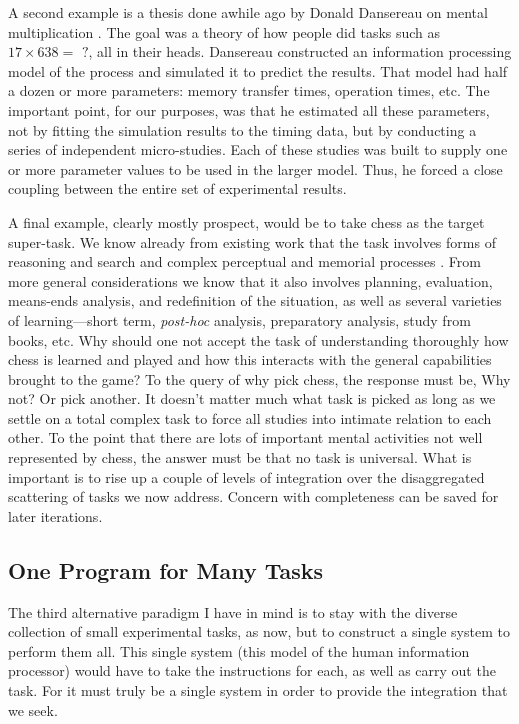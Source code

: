 \documentclass{paper}
\newcounter{oldpagecounter}
\newcommand\oldpage{\stepcounter{oldpagecounter}\marginpar{\footnotesize{\textcolor{mygrey}{pg. \arabic{oldpagecounter}}}}}
\begin{document}
A second example is a thesis done awhile ago by Donald Dansereau on mental multiplication \citep{Dansereau1969}. The goal was a theory of how people did tasks such as $17 \times 638 =\textrm{ ?}$, all in their heads. Dansereau constructed an information processing model of the process and simulated it to predict the results. That model had half a dozen or more parameters: memory transfer times, operation times, etc. The important point, for our purposes, was that he estimated all these parameters, not by fitting the simulation results to the timing data, but by conducting a series of independent micro-studies. Each of these studies was built to supply one or more parameter values to be used in the larger model. Thus, he forced a close coupling between the entire set of experimental results.

A final example, clearly mostly prospect, would be to take chess as the target super-task. We know already from existing work that the task involves forms of reasoning and search \citep{deGroot1965, NewellSimon1972, WagnerScurrah1971} and complex perceptual and memorial processes \citep[Chase \& Simon, This volume, Chapter 5]{deGroot1966}. From more general considerations we know that it also involves planning, evaluation, means-ends analysis, and redefinition of the situation, as well as several varieties of learning---short term, \textit{post-hoc} analysis, preparatory analysis, study from books, etc. Why should one not accept the task of understanding thoroughly how chess is learned and played and how this interacts with the general capabilities brought to the game? To the query of why pick chess, the response must be, Why not? Or pick another. It doesn't matter much what task is picked as long as we settle on a total complex task to force all studies into intimate relation to each other. To the point that there are lots of important mental activities not well represented by chess, the answer must be that no task is universal. What is important is to rise up a couple of levels of integration over the disaggregated scattering of tasks we now address. Concern with completeness can be saved for later iterations.\oldpage

\subsection*{One Program for Many Tasks}
The third alternative paradigm I have in mind is to stay with the diverse collection of small experimental tasks, as now, but to construct a single system to perform them all. This single system (this model of the human information processor) would have to take the instructions for each, as well as carry out the task. For it must truly be a single system in order to provide the integration that we seek.
\end{document}
